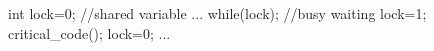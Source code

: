 \documentclass[varwidth=15.5em,crop]{standalone}
\begin{document}
\begin{ccode}
int lock=0; //shared variable
{
  ...
  while(lock); //busy waiting
  lock=1;
  critical_code();
  lock=0;
  ...
}        
\end{ccode}
\end{document}
